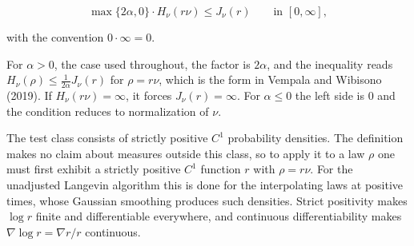 \documentclass[11pt,a4paper]{report}
\begin{document}
\[\max\{2\alpha,0\}\cdot H_\nu(r\nu)\le J_\nu(r)\qquad\text{in }[0,\infty],\]


with the convention \(0\cdot\infty=0\).




For \(\alpha>0\), the case used throughout, the factor is \(2\alpha\), and the inequality reads \(H_\nu(\rho)\le\frac1{2\alpha}J_\nu(r)\) for \(\rho=r\nu\), which is the form in Vempala and Wibisono (2019). If \(H_\nu(r\nu)=\infty\), it forces \(J_\nu(r)=\infty\). For \(\alpha\le0\) the left side is \(0\) and the condition reduces to normalization of \(\nu\).




The test class consists of strictly positive \(C^1\) probability densities. The definition makes no claim about measures outside this class, so to apply it to a law \(\rho\) one must first exhibit a strictly positive \(C^1\) function \(r\) with \(\rho=r\nu\). For the unadjusted Langevin algorithm this is done for the interpolating laws at positive times, whose Gaussian smoothing produces such densities. Strict positivity makes \(\log r\) finite and differentiable everywhere, and continuous differentiability makes \(\nabla\log r=\nabla r/r\) continuous.
\end{document}
